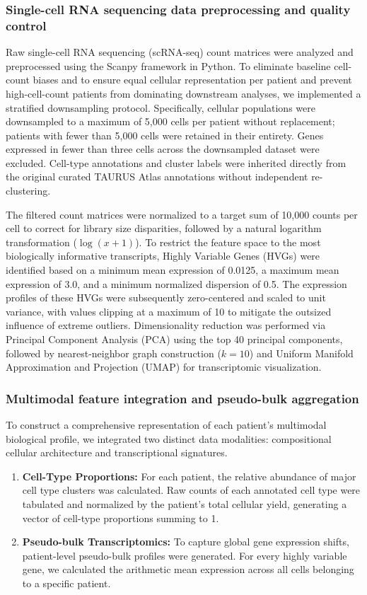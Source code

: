 \documentclass{bmcart}
\begin{document}
\subsubsection*{Single-cell RNA sequencing data preprocessing and quality control}
Raw single-cell RNA sequencing (scRNA-seq) count matrices were analyzed and preprocessed using the Scanpy framework \cite{wolf} in Python. To eliminate baseline cell-count biases and to ensure equal cellular representation per patient and prevent high-cell-count patients from dominating downstream analyses, we implemented a stratified downsampling protocol. Specifically, cellular populations were downsampled to a maximum of 5,000 cells per patient without replacement; patients with fewer than 5,000 cells were retained in their entirety. Genes expressed in fewer than three cells across the downsampled dataset were excluded. Cell-type annotations and cluster labels were inherited directly from the original curated TAURUS Atlas annotations without independent re-clustering.

The filtered count matrices were normalized to a target sum of 10,000 counts per cell to correct for library size disparities, followed by a natural logarithm transformation ($\log(x+1)$). To restrict the feature space to the most biologically informative transcripts, Highly Variable Genes (HVGs) were identified based on a minimum mean expression of 0.0125, a maximum mean expression of 3.0, and a minimum normalized dispersion of 0.5. The expression profiles of these HVGs were subsequently zero-centered and scaled to unit variance, with values clipping at a maximum of 10 to mitigate the outsized influence of extreme outliers. Dimensionality reduction was performed via Principal Component Analysis (PCA) using the top 40 principal components, followed by nearest-neighbor graph construction ($k=10$) and Uniform Manifold Approximation and Projection (UMAP) for transcriptomic visualization.

\subsubsection*{Multimodal feature integration and pseudo-bulk aggregation}
To construct a comprehensive representation of each patient's multimodal biological profile, we integrated two distinct data modalities: compositional cellular architecture and transcriptional signatures.

\begin{enumerate}
\item \textbf{Cell-Type Proportions:} For each patient, the relative abundance of major cell type clusters was calculated. Raw counts of each annotated cell type were tabulated and normalized by the patient's total cellular yield, generating a vector of cell-type proportions summing to 1.
\item \textbf{Pseudo-bulk Transcriptomics:} To capture global gene expression shifts, patient-level pseudo-bulk profiles were generated. For every highly variable gene, we calculated the arithmetic mean expression across all cells belonging to a specific patient.
\end{enumerate}
\end{document}
